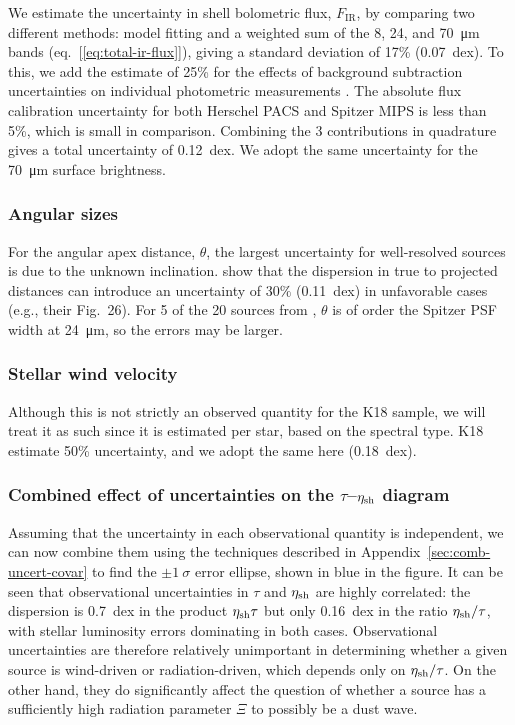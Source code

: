 We estimate the uncertainty in shell bolometric flux,
\(F_{\text{IR}}\), by comparing two different methods: model fitting
\citep{Kobulnicky:2017a} and a weighted sum of the 8, 24, and
\SI{70}{\um} bands (eq.~[\ref{eq:total-ir-flux}]), giving a standard
deviation of 17\% (0.07~dex).  To this, we add the estimate of 25\%
for the effects of background subtraction uncertainties on individual
photometric measurements \citep{Kobulnicky:2017a}. The absolute flux
calibration uncertainty for both Herschel PACS \citep{Balog:2014a} and
Spitzer MIPS \citep{Engelbracht:2007a} is less than 5\%, which is
small in comparison. Combining the 3 contributions in quadrature gives
a total uncertainty of 0.12~dex.  We adopt the same uncertainty for
the \SI{70}{\um} surface brightness.

\subsubsection{Angular sizes}
\label{sec:angular-sizes}

For the angular apex distance, \(\theta\), the largest uncertainty for
well-resolved sources is due to the unknown inclination.
\citet{Tarango-Yong:2018a} show that the dispersion in true to
projected distances can introduce an uncertainty of \(30\%\)
(0.11~dex) in unfavorable cases (e.g., their Fig.~26).  For 5 of the
20 sources from \citet{Kobulnicky:2018a}, \(\theta\) is of order the
Spitzer PSF width at \SI{24}{\um}, so the errors may be larger.

\subsubsection{Stellar wind velocity}
\label{sec:stell-wind-veloc}

Although this is not strictly an observed quantity for the K18 sample,
we will treat it as such since it is estimated per star, based on the
spectral type.  K18 estimate 50\% uncertainty, and we adopt the same
here (0.18~dex).


\subsubsection{Combined effect of uncertainties on the
  \(\tau\)--\(\eta_{\text{sh}}\) diagram}
\label{sec:comb-effect-uncert}

Assuming that the uncertainty in each observational quantity is
independent, we can now combine them using the techniques described in
Appendix~\ref{sec:comb-uncert-covar} to find the \(\pm 1~\sigma\) error
ellipse, shown in blue in the figure.  It can be seen that
observational uncertainties in \(\tau\) and \(\eta_{\text{sh}}\) are highly
correlated: the dispersion is \SI{0.7}{dex} in the product
\(\eta_{\text{sh}} \tau\) but only \SI{0.16}{dex} in the ratio
\(\eta_{\text{sh}}/\tau\), with stellar luminosity errors dominating in both
cases.  Observational uncertainties are therefore relatively
unimportant in determining whether a given source is wind-driven or
radiation-driven, which depends only on \(\eta_{\text{sh}}/\tau\).  On the other
hand, they do significantly affect the question of whether a source
has a sufficiently high radiation parameter \(\Xi\) to possibly be a
dust wave.


